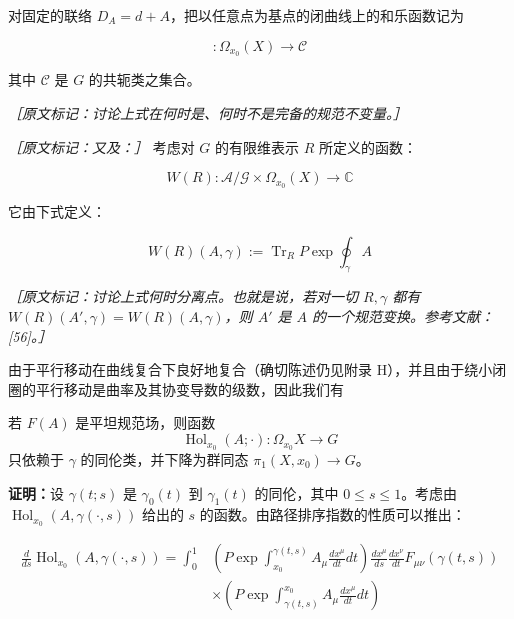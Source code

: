 对固定的联络 $D_A=d+A$，把以任意点为基点的闭曲线上的和乐函数记为

\begin{equation}
  [\operatorname{Hol}_{x_0}(A,\cdot)]:\Omega_{x_0}(X)\to\mathcal{C}
  \tag{2.102}
  \label{eq:2.102}
\end{equation}

其中 $\mathcal{C}$ 是 $G$ 的共轭类之集合。

{\small\itshape ［原文标记：讨论上式在何时是、何时不是完备的规范不变量。］}%

{\small\itshape ［原文标记：又及：］}%
考虑对 $G$ 的有限维表示 $R$ 所定义的函数：

\begin{equation}
  W(R):\mathcal{A}/\mathcal{G}\times\Omega_{x_0}(X)\to\mathbb{C}
  \tag{2.103}
  \label{eq:2.103}
\end{equation}

它由下式定义：

\begin{equation}
  W(R)(A,\gamma):=\operatorname{Tr}_R P\exp\oint_{\gamma}A
  \tag{2.104}
  \label{eq:2.104}
\end{equation}

{\small\itshape ［原文标记：讨论上式何时分离点。也就是说，若对一切 $R,\gamma$ 都有 $W(R)(A',\gamma)=W(R)(A,\gamma)$，则 $A'$ 是 $A$ 的一个规范变换。参考文献：[56]。］}%

由于平行移动在曲线复合下良好地复合（确切陈述仍见附录 H），并且由于绕小闭圈的平行移动是曲率及其协变导数的级数，因此我们有

\begin{theorem}
  若 $F(A)$ 是平坦规范场，则函数
  \begin{equation}
    \operatorname{Hol}_{x_0}(A;\cdot):\Omega_{x_0}X\to G
    \tag{2.105}
    \label{eq:2.105}
  \end{equation}
  只依赖于 $\gamma$ 的同伦类，并下降为群同态 $\pi_1(X,x_0)\to G$。
\end{theorem}

\textbf{证明：}设 $\gamma(t;s)$ 是 $\gamma_0(t)$ 到 $\gamma_1(t)$ 的同伦，其中 $0\le s\le 1$。考虑由 $\operatorname{Hol}_{x_0}(A,\gamma(\cdot,s))$ 给出的 $s$ 的函数。由路径排序指数的性质可以推出：

\begin{equation}
  \begin{aligned}
    \frac{d}{ds}\operatorname{Hol}_{x_0}(A,\gamma(\cdot,s))
    =\int_0^1 & \left(P\exp\int_{x_0}^{\gamma(t,s)}A_\mu\frac{dx^\mu}{dt}dt\right)
    \frac{dx^\mu}{ds}\frac{dx^\nu}{dt}F_{\mu\nu}(\gamma(t,s))\\
    & \times\left(P\exp\int_{\gamma(t,s)}^{x_0}A_\mu\frac{dx^\mu}{dt}dt\right)
  \end{aligned}
  \tag{2.106}
  \label{eq:2.106}
\end{equation}

